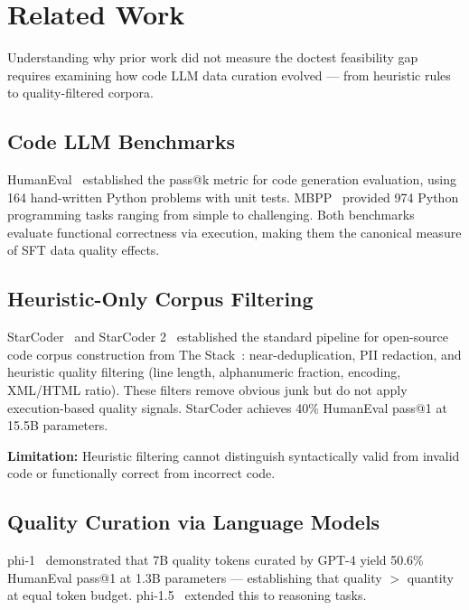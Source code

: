 \section{Related Work}
\label{sec:related}

Understanding why prior work did not measure the doctest feasibility gap requires examining
how code LLM data curation evolved --- from heuristic rules to quality-filtered corpora.

\subsection{Code LLM Benchmarks}

HumanEval~\cite{Chen2021Evaluating} established the pass@k metric for code generation evaluation,
using 164 hand-written Python problems with unit tests. MBPP~\cite{Austin2021Program}
provided 974 Python programming tasks ranging from simple to challenging. Both benchmarks
evaluate functional correctness via execution, making them the canonical measure of SFT
data quality effects.

\subsection{Heuristic-Only Corpus Filtering}

StarCoder~\cite{Li2023StarCoder} and StarCoder 2~\cite{Lozhkov2024StarCoder2} established
the standard pipeline for open-source code corpus construction from The Stack~\cite{Kocetkov2022Stack}:
near-deduplication, PII redaction, and heuristic quality filtering (line length, alphanumeric
fraction, encoding, XML/HTML ratio). These filters remove obvious junk but do not apply
execution-based quality signals. StarCoder achieves 40\% HumanEval pass@1 at 15.5B parameters.

\textbf{Limitation:} Heuristic filtering cannot distinguish syntactically valid from invalid
code or functionally correct from incorrect code.

\subsection{Quality Curation via Language Models}

phi-1~\cite{Gunasekar2023Textbooks} demonstrated that 7B quality tokens curated by GPT-4 yield
50.6\% HumanEval pass@1 at 1.3B parameters --- establishing that quality $>$ quantity at
equal token budget. phi-1.5~\cite{Li2023Textbooks2} extended this to reasoning tasks.

